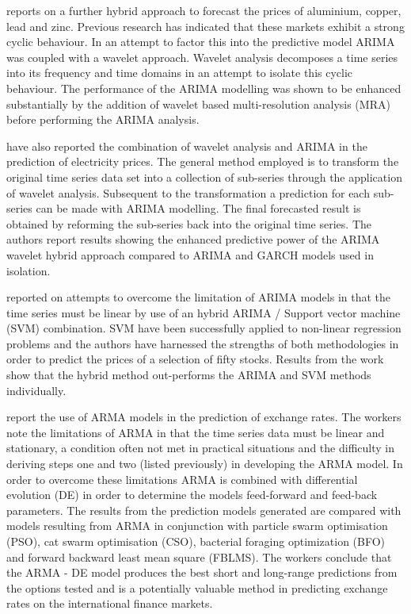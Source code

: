 \cite{Kriechbaumer201432} reports on a further hybrid approach to forecast the prices of aluminium, copper, lead and zinc. Previous research has indicated that these markets exhibit a strong cyclic behaviour. In an attempt to factor this into the predictive model ARIMA was coupled with a wavelet approach. Wavelet analysis decomposes a time series into its frequency and time domains in an attempt to isolate this cyclic behaviour. The performance of the ARIMA modelling was shown to be enhanced substantially by the addition of wavelet based multi-resolution analysis (MRA) before performing the ARIMA analysis.

\cite{Tan20103606} have also reported the combination of wavelet analysis and ARIMA in the prediction of electricity prices. The general method employed is to transform the original time series data set into a collection of sub-series through the application of wavelet analysis. Subsequent to the transformation a prediction for each sub-series can be made with ARIMA modelling. The final forecasted result is obtained by reforming the sub-series back into the original time series. The authors report results showing the enhanced predictive power of the ARIMA wavelet hybrid approach compared to ARIMA and GARCH models used in isolation.

\cite{Pai2005497} reported on attempts to overcome the limitation of ARIMA models in that the time series must be linear by use of an hybrid ARIMA / Support vector machine (SVM) combination. SVM have been successfully applied to non-linear regression problems and the authors have harnessed the strengths of both methodologies in order to predict the prices of a selection of fifty stocks. Results from the work show that the hybrid method out-performs the ARIMA and SVM methods individually.

\cite{Rout20147} report the use of ARMA models in the prediction of exchange rates. The workers note the limitations of ARMA in that the time series data must be linear and stationary, a condition often not met in practical situations and the difficulty in deriving steps one and two (listed previously) in developing the ARMA model. In order to overcome these limitations ARMA is combined with differential evolution (DE) in order to determine the models feed-forward and feed-back parameters. The results from the prediction models generated are compared with models resulting from ARMA in conjunction with particle swarm optimisation (PSO), cat swarm optimisation (CSO), bacterial foraging optimization (BFO) and forward backward least mean square (FBLMS). The workers conclude that the ARMA - DE model produces the best short and long-range predictions from the options tested and is a potentially valuable method in predicting exchange rates on the international finance markets.

